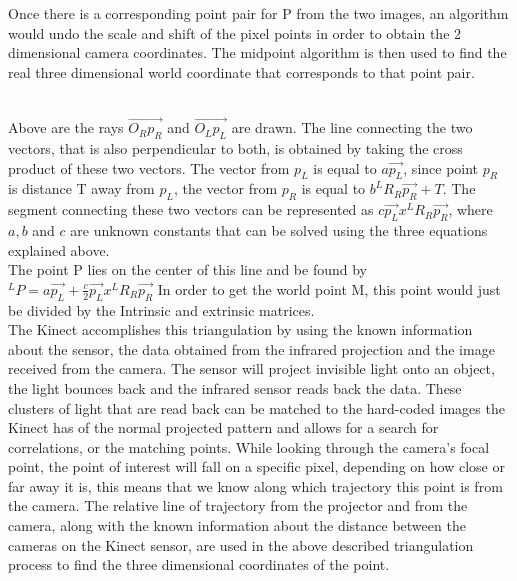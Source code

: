 \documentclass[12pt,twocolumn]{article}
\begin{document}
\indent Once there is a corresponding point pair for P from the two images, an algorithm would undo the scale and shift of the pixel points in order to obtain the 2 dimensional camera coordinates. The midpoint algorithm is then used to find the real three dimensional world coordinate that corresponds to that point pair.\\ 
  \\
\indent Above are the rays $\vec{O_{R}p_{R}}$ and $\vec{O_{L}p_{L}}$ are drawn. The line connecting the two vectors, that is also perpendicular to both, is obtained by taking the cross product of these two vectors. The vector from $p_{L}$ is equal to $a\vec{p_{L}}$, since point $p_{R}$ is distance T away from $p_{L}$, the vector from $p_{R}$ is equal to $b^{L}R_{R}\vec{p_{R}}+T$. The segment connecting these two vectors can be represented as $c\vec{p_{L}}x^{L}R_{R}\vec{p_{R}}$, where $a,b$ and $c$ are unknown constants that can be solved using the three equations explained above. \\
The point P lies on the center of this line and be found by $^{L}P=a\vec{p_{L}}+\frac{c}{2}\vec{p_{L}}x^{L}R_{R}\vec{p_{R}}$ In order to get the world point M, this point would just be divided by the Intrinsic and extrinsic matrices.\\

\indent  The Kinect accomplishes this triangulation by using the known information about the sensor, the data obtained from the infrared projection and the image received from the camera. The sensor will project invisible light onto an object, the light bounces back and the infrared sensor reads back the data. These clusters of light that are read back can be matched to the hard-coded images the Kinect has of the normal projected pattern and allows for a search for correlations, or the matching points. While looking through the camera's focal point, the point of interest will fall on a specific pixel, depending on how close or far away it is, this means that we know along which trajectory this point is from the camera. The relative line of trajectory from the projector and from the camera, along with the known information about the distance between the cameras on the Kinect sensor, are used in the above described triangulation process to find the three dimensional coordinates of the point. \\
\end{document}
